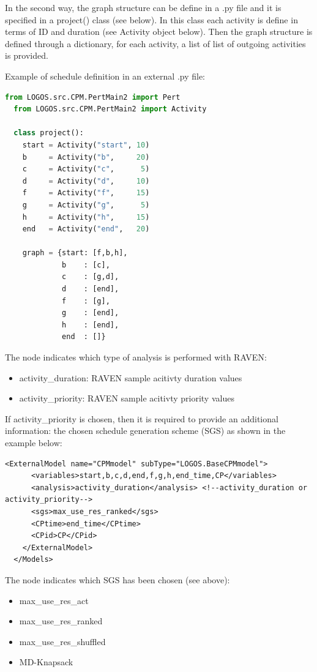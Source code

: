 In the second way, the graph structure can be define in a .py file and it is specified in a
project() class (see below). In this class each activity is define in terms of ID and duration
(see Activity object below).
Then the graph structure is defined through a dictionary, for each activity, a list of list of
outgoing activities is provided.

Example of schedule definition in an external .py file:
\begin{lstlisting}[language=Python]
  from LOGOS.src.CPM.PertMain2 import Pert
  from LOGOS.src.CPM.PertMain2 import Activity

  class project():
    start = Activity("start", 10)
    b     = Activity("b",     20)
    c     = Activity("c",      5)
    d     = Activity("d",     10)
    f     = Activity("f",     15)
    g     = Activity("g",      5)
    h     = Activity("h",     15)
    end   = Activity("end",   20)

    graph = {start: [f,b,h],
             b    : [c],
             c    : [g,d],
             d    : [end],
             f    : [g],
             g    : [end],
             h    : [end],
             end  : []}
  \end{lstlisting}

The  node indicates which type of analysis is performed with RAVEN:
\begin{itemize}
  \item activity_duration: RAVEN sample acitivty duration values
  \item activity_priority: RAVEN sample acitivty priority values 
\end{itemize}

If activity_priority is chosen, then it is required to provide an additional information: the 
chosen schedule generation scheme (SGS) as shown in the example below:

\begin{lstlisting}[style=XML]
    <ExternalModel name="CPMmodel" subType="LOGOS.BaseCPMmodel">
      <variables>start,b,c,d,end,f,g,h,end_time,CP</variables>
      <analysis>activity_duration</analysis> <!--activity_duration or activity_priority-->
      <sgs>max_use_res_ranked</sgs>
      <CPtime>end_time</CPtime>
      <CPid>CP</CPid>
    </ExternalModel>
  </Models>
\end{lstlisting}

The  node indicates which SGS has been chosen (see above):
\begin{itemize}
  \item max_use_res_act
  \item max_use_res_ranked
  \item max_use_res_shuffled
  \item MD-Knapsack
\end{itemize}

